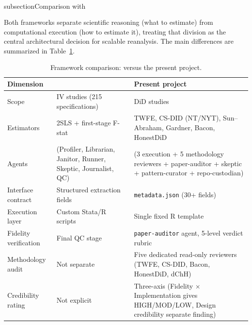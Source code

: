 \\subsection{Comparison with \texorpdfstring{\textcite{xu2026scaling}}{Xu and Yang (2026)}}
\label{sec:appc_xuyang}

Both frameworks separate scientific reasoning (what to estimate) from computational execution (how to estimate it), treating that division as the central architectural decision for scalable reanalysis. The main differences are summarized in Table~\ref{tab:framework_comparison}.

\begin{table}[H]
\centering
\caption{Framework comparison: \textcite{xu2026scaling} versus the present project.}
\label{tab:framework_comparison}
\small
\begin{tabular}{>{\raggedright\arraybackslash}p{3.4cm}
                >{\raggedright\arraybackslash}p{5.4cm}
                >{\raggedright\arraybackslash}p{5.4cm}}
\toprule
\textbf{Dimension} & \textbf{\textcite{xu2026scaling}} & \textbf{Present project} \\
\midrule
Scope                 & 92 IV studies (215 specifications)                                                   & 53 DiD studies \\[4pt]
Estimators            & 2SLS + first-stage F-stat                                                            & TWFE, CS-DID (NT/NYT), Sun--Abraham, Gardner, Bacon, HonestDiD \\[4pt]
Agents                & 7 (Profiler, Librarian, Janitor, Runner, Skeptic, Journalist, QC)                    & 9 (3 execution + 5 methodology reviewers + paper-auditor + skeptic + pattern-curator + repo-custodian) \\[4pt]
Interface contract    & Structured extraction fields                                                         & \texttt{metadata.json} (30+ fields) \\[4pt]
Execution layer       & Custom Stata/R scripts                                                               & Single fixed R template \\[4pt]
Fidelity verification & Final QC stage                                                                       & \texttt{paper-auditor} agent, 5-level verdict rubric \\[4pt]
Methodology audit     & Not separate                                                                         & Five dedicated read-only reviewers (TWFE, CS-DID, Bacon, HonestDiD, dChH) \\[4pt]
Credibility rating    & Not explicit                                                                         & Three-axis (Fidelity $\times$ Implementation gives HIGH/MOD/LOW, Design credibility separate finding) \\[4pt]

\end{tabular}
\end{table}
